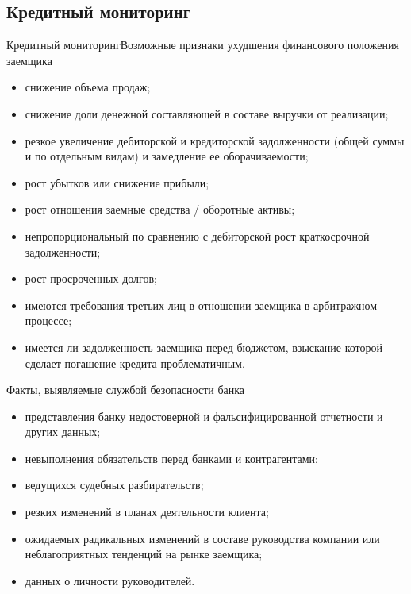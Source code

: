 \documentclass[_Banking_p2.tex]{subfiles}
\begin{document}
\subsection{Кредитный мониторинг}
\begin{frame}[allowframebreaks]{Кредитный мониторинг}{Возможные признаки ухудшения финансового положения заемщика}
\begin{itemize}
	\item снижение объема продаж;
	\item снижение доли денежной составляющей в составе выручки от реализации;
	\item резкое увеличение дебиторской и кредиторской задолженности (общей суммы и по отдельным видам) и замедление ее оборачиваемости;
	\item рост убытков или снижение прибыли;
	\item рост отношения заемные средства / оборотные активы;
	
	\pagebreak
	\item непропорциональный по сравнению с дебиторской рост краткосрочной
	задолженности;
	\item рост просроченных долгов;
	\item имеются требования третьих лиц в отношении заемщика в арбитражном процессе;
	\item имеется ли задолженность заемщика перед бюджетом, взыскание которой сделает погашение кредита проблематичным.
\end{itemize}
\end{frame}
\begin{frame}[allowframebreaks]{Факты, выявляемые службой безопасности банка}
\begin{itemize}
	\item представления банку недостоверной и
	фальсифицированной отчетности и других
	данных;
	\item невыполнения обязательств перед банками и
	контрагентами;
	\item ведущихся судебных разбирательств;
	
	\pagebreak
	\item резких изменений в планах деятельности
	клиента;
	\item ожидаемых радикальных изменений в составе
	руководства компании или неблагоприятных
	тенденций на рынке заемщика;
	\item данных о личности руководителей.
\end{itemize}
\end{frame}
\end{document}
